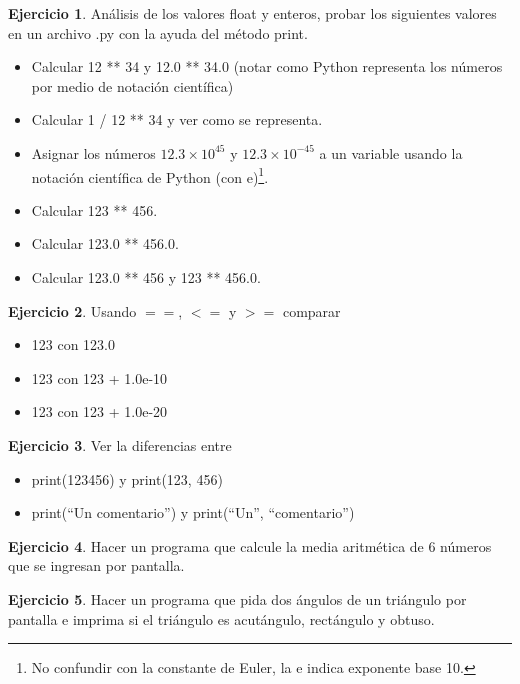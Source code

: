 \documentclass[12pt]{article}
\theoremstyle{definition}
\newtheorem{exercise}{Ejercicio}[section]
\begin{document}
    \begin{exercise}
        Análisis de los valores float y enteros, probar los siguientes valores en un archivo .py con la ayuda del método print.
        \begin{itemize}
            \item Calcular 12 ** 34 y 12.0 ** 34.0 (notar como Python representa los números por medio de notación científica)
            \item Calcular 1 / 12 ** 34 y ver como se representa.
            \item Asignar los números $12.3\times 10^{45}$ y $12.3\times 10^{-45}$ a un variable usando la notación científica de Python (con e)\footnote{No confundir con la constante de Euler, la e indica exponente base 10.}.
            \item Calcular 123 ** 456.
            \item Calcular 123.0 ** 456.0.
            \item Calcular 123.0 ** 456 y 123 ** 456.0.
        \end{itemize}
    \end{exercise}

    \begin{exercise}
        Usando $==$, $<=$ y $>=$ comparar
        \begin{itemize}
            \item 123 con 123.0
            \item 123 con 123 + 1.0e-10
            \item 123 con 123 + 1.0e-20
        \end{itemize}
    \end{exercise}

    \begin{exercise}
        Ver la diferencias entre
        \begin{itemize}
            \item print(123456) y print(123, 456)
            \item print(``Un comentario'') y print(``Un'', ``comentario'')
        \end{itemize}
    \end{exercise}

    \begin{exercise}
        Hacer un programa que calcule la media aritmética de 6 números que se ingresan por pantalla.
    \end{exercise}

    \begin{exercise}
        Hacer un programa que pida dos ángulos de un triángulo por pantalla e imprima si el triángulo es acutángulo, rectángulo y obtuso.
    \end{exercise}
\end{document}
